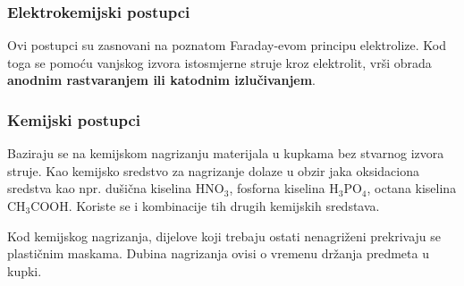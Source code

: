 \documentclass[a4paper,12pt]{article}
\numberwithin{figure}{section}
\begin{document}
\subsubsection{Elektrokemijski postupci}
Ovi postupci su zasnovani na poznatom Faraday-evom principu elektrolize. Kod toga se pomoću vanjskog izvora istosmjerne struje kroz elektrolit, vrši obrada \textbf{anodnim rastvaranjem ili katodnim izlučivanjem}.
\subsubsection{Kemijski postupci}
Baziraju se na kemijskom nagrizanju materijala u kupkama bez stvarnog izvora struje. Kao kemijsko sredstvo za nagrizanje dolaze u obzir jaka oksidaciona sredstva kao npr. dušična kiselina HNO$_{3}$, fosforna kiselina H$_{3}$PO$_{4}$, octana kiselina CH$_{3}$COOH. Koriste se i kombinacije tih drugih kemijskih sredstava. \par
Kod kemijskog nagrizanja, dijelove koji trebaju ostati nenagriženi prekrivaju se plastičnim maskama. Dubina nagrizanja ovisi o vremenu držanja predmeta u kupki.
\end{document}

